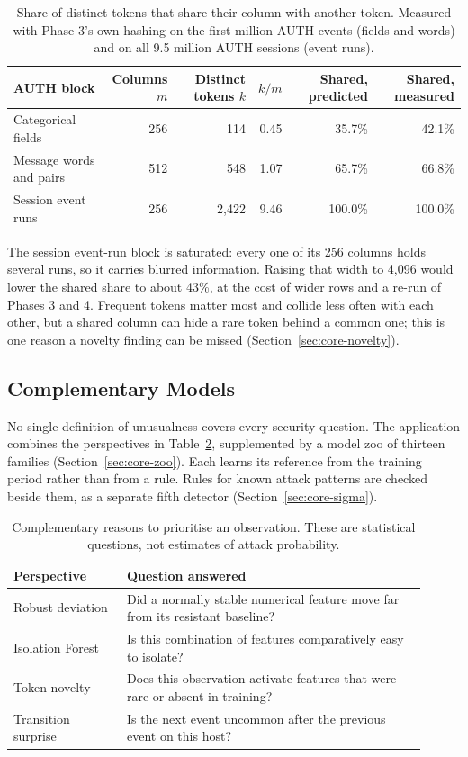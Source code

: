 \documentclass[11pt,a4paper]{article}
\begin{document}
\begin{table}[H]
\centering\small
\begin{tabular}{lrrrrr}
\toprule
\textbf{AUTH block} & \textbf{Columns \(m\)} & \textbf{Distinct tokens \(k\)} & \textbf{\(k/m\)} & \textbf{Shared, predicted} & \textbf{Shared, measured} \\
\midrule
Categorical fields & 256 & 114 & 0.45 & 35.7\% & 42.1\% \\
Message words and pairs & 512 & 548 & 1.07 & 65.7\% & 66.8\% \\
Session event runs & 256 & 2,422 & 9.46 & 100.0\% & 100.0\% \\
\bottomrule
\end{tabular}
\caption{Share of distinct tokens that share their column with another token. Measured with Phase 3's own hashing on the first million AUTH events (fields and words) and on all 9.5 million AUTH sessions (event runs).}
\label{tab:core-hashwidth}
\end{table}

The session event-run block is saturated: every one of its 256 columns holds several runs, so it carries blurred information. Raising that width to 4,096 would lower the shared share to about 43\%, at the cost of wider rows and a re-run of Phases 3 and 4. Frequent tokens matter most and collide less often with each other, but a shared column can hide a rare token behind a common one; this is one reason a novelty finding can be missed (Section~\ref{sec:core-novelty}).

\subsection{Complementary Models}

No single definition of unusualness covers every security question. The application combines the perspectives in Table~\ref{tab:core-detectors}, supplemented by a model zoo of thirteen families (Section~\ref{sec:core-zoo}). Each learns its reference from the training period rather than from a rule. Rules for known attack patterns are checked beside them, as a separate fifth detector (Section~\ref{sec:core-sigma}).

\begin{table}[H]
\centering\small
\begin{tabular}{p{0.25\linewidth}p{0.66\linewidth}}
\toprule
\textbf{Perspective} & \textbf{Question answered} \\
\midrule
Robust deviation & Did a normally stable numerical feature move far from its resistant baseline? \\
Isolation Forest & Is this combination of features comparatively easy to isolate? \\
Token novelty & Does this observation activate features that were rare or absent in training? \\
Transition surprise & Is the next event uncommon after the previous event on this host? \\
\bottomrule
\end{tabular}
\caption{Complementary reasons to prioritise an observation. These are statistical questions, not estimates of attack probability.}
\label{tab:core-detectors}
\end{table}
\end{document}
